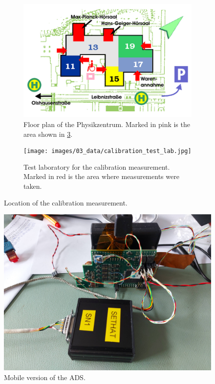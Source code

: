 \begin{figure}[h]
    \begin{subfigure}[t]{.5\textwidth}
        \centering
        \includegraphics[width=0.9\linewidth]{images/03_data/lageplan Physikzentrum.png}
        \caption[Floor plan of the Physikzentrum.]{Floor plan of the Physikzentrum. Marked in pink is the area shown in \ref{fig:test_lab}.}
        \label{fig:lageplan_physikzentrum}
    \end{subfigure}
    \begin{subfigure}[t]{.5\textwidth}
    \centering
    \texttt{[image: images/03\_data/calibration\_test\_lab.jpg]}
    \caption[Test laboratory for the calibration measurement.]{Test laboratory for the calibration measurement. Marked in red is the area where measurements were taken.}
    \label{fig:test_lab}
    \end{subfigure}
    \caption{Location of the calibration measurement.}
\end{figure}

\begin{figure}[h]
    \centering
    \includegraphics[width=0.7\linewidth]{images/03_data/sethat_mobile.jpg}
    \caption{Mobile version of the \ac{ADS}.}
    \label{fig:ads_mobile}
\end{figure}
